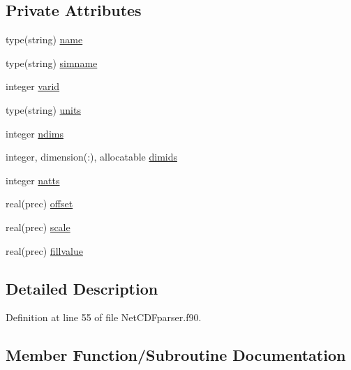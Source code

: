 \subsection*{Private Attributes}
\begin{DoxyCompactItemize}
\item 
type(string) \mbox{\hyperlink{structnetcdfparser__mod_1_1var__t_a86d1bd82de1a8bcd684e0d75cc3d9cc3}{name}}
\item 
type(string) \mbox{\hyperlink{structnetcdfparser__mod_1_1var__t_af5ea209bf909357b775640ad4e9e43d3}{simname}}
\item 
integer \mbox{\hyperlink{structnetcdfparser__mod_1_1var__t_af3b333b148f6159bade3f9263c03892e}{varid}}
\item 
type(string) \mbox{\hyperlink{structnetcdfparser__mod_1_1var__t_ac7b0d52ef17496213c66b5a34dc8f8b6}{units}}
\item 
integer \mbox{\hyperlink{structnetcdfparser__mod_1_1var__t_a1aef5b6886c1e1cbb6714745dfd8d2aa}{ndims}}
\item 
integer, dimension(\+:), allocatable \mbox{\hyperlink{structnetcdfparser__mod_1_1var__t_a1bb991339dd3410a02d8e36a70672e61}{dimids}}
\item 
integer \mbox{\hyperlink{structnetcdfparser__mod_1_1var__t_aeae7353a3f58ee5efac21563a56b41ac}{natts}}
\item 
real(prec) \mbox{\hyperlink{structnetcdfparser__mod_1_1var__t_a04d38d90fee93b81da854bd218df23a1}{offset}}
\item 
real(prec) \mbox{\hyperlink{structnetcdfparser__mod_1_1var__t_a11a2f51aa328c9c0387b543f3a5c2485}{scale}}
\item 
real(prec) \mbox{\hyperlink{structnetcdfparser__mod_1_1var__t_a8e89e092236a61f096a44ad123d4d35e}{fillvalue}}
\end{DoxyCompactItemize}


\subsection{Detailed Description}


Definition at line 55 of file Net\+C\+D\+Fparser.\+f90.



\subsection{Member Function/\+Subroutine Documentation}
\mbox{\label{structnetcdfparser__mod_1_1var__t_a0cd9a195dc76bda0993ee246474e9b08}} 
